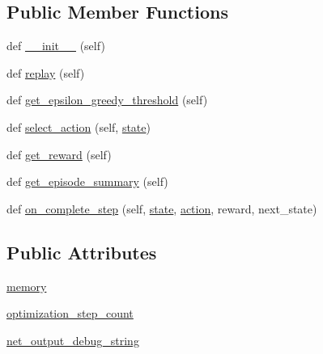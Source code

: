 \subsection*{Public Member Functions}
\begin{DoxyCompactItemize}
\item 
def \hyperlink{classtrain__q__learning_1_1_q_learning_training_node_a98b56b8814dfdae3ee1488cb8e671bfc}{\+\_\+\+\_\+init\+\_\+\+\_\+} (self)
\item 
def \hyperlink{classtrain__q__learning_1_1_q_learning_training_node_a4669e7b12be6befbb4381c256c84c2c2}{replay} (self)
\item 
def \hyperlink{classtrain__q__learning_1_1_q_learning_training_node_a99ea57ada4e8b3ef76eac452db94b15b}{get\+\_\+epsilon\+\_\+greedy\+\_\+threshold} (self)
\item 
def \hyperlink{classtrain__q__learning_1_1_q_learning_training_node_a5dc01997b295135bb2aebb1e7736bf4d}{select\+\_\+action} (self, \hyperlink{classtraining__node_1_1_training_node_ab3ec26c96f6e4d86cd0be251d4fd1af4}{state})
\item 
def \hyperlink{classtrain__q__learning_1_1_q_learning_training_node_ad3420be2be57f13172edad27a8761101}{get\+\_\+reward} (self)
\item 
def \hyperlink{classtrain__q__learning_1_1_q_learning_training_node_a442305886b0215ef42134eec79b97293}{get\+\_\+episode\+\_\+summary} (self)
\item 
def \hyperlink{classtrain__q__learning_1_1_q_learning_training_node_a6652454b981fd6584a015e7f2fd5631f}{on\+\_\+complete\+\_\+step} (self, \hyperlink{classtraining__node_1_1_training_node_ab3ec26c96f6e4d86cd0be251d4fd1af4}{state}, \hyperlink{classtraining__node_1_1_training_node_a9aca91d2739de83e292f046f6047c193}{action}, reward, next\+\_\+state)
\end{DoxyCompactItemize}
\subsection*{Public Attributes}
\begin{DoxyCompactItemize}
\item 
\hyperlink{classtrain__q__learning_1_1_q_learning_training_node_a87fe164a17db112700c39e84a767dcd4}{memory}
\item 
\hyperlink{classtrain__q__learning_1_1_q_learning_training_node_ac921e45077a91450fd9d01b109bf0a60}{optimization\+\_\+step\+\_\+count}
\item 
\hyperlink{classtrain__q__learning_1_1_q_learning_training_node_ad1f8bb7b1ca27f25e4e59abd71df4efe}{net\+\_\+output\+\_\+debug\+\_\+string}
\end{DoxyCompactItemize}


